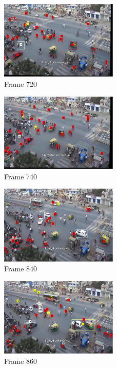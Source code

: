 \documentclass[a4paper, 10pt, conference]{ieeeconf}      %
\begin{document}
\begin{figure}[h!]
\caption{Frame 720}
\centering
\includegraphics[width=0.5\textwidth]{720.jpg}
\end{figure}

\begin{figure}[h!]
\caption{Frame 740}
\centering
\includegraphics[width=0.5\textwidth]{740.jpg}
\end{figure}

\begin{figure}[h!]
\caption{Frame 840}
\centering
\includegraphics[width=0.5\textwidth]{840.jpg}
\end{figure}

\begin{figure}[h!]
\caption{Frame 860}
\centering
\includegraphics[width=0.5\textwidth]{860.jpg}
\end{figure}
\end{document}
